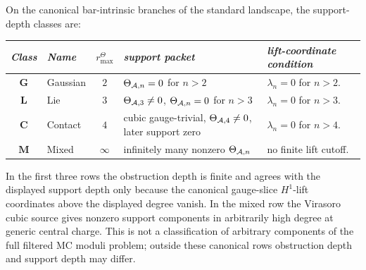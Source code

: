 \begin{theorem}
\label{thm:thqg-four-class}
\ClaimStatusProvedHere
{}
On the canonical bar-intrinsic branches of the standard landscape,
the support-depth classes are:
\begin{center}
\small
\renewcommand{\arraystretch}{1.15}
\begin{tabular}{clcp{}p{}}
\toprule
\emph{Class} & \emph{Name} & \(r^\Theta_{\max}\) &
\emph{support packet} & \emph{lift-coordinate condition} \\
\midrule
$\mathbf{G}$ & Gaussian &
 $2$ &
 \(\Theta_{\mathcal{A},n}=0\) for \(n>2\) &
 \(\lambda_n=0\) for \(n>2\). \\
$\mathbf{L}$ & Lie &
 $3$ &
 \(\Theta_{\mathcal{A},3}\neq0\), \(\Theta_{\mathcal{A},n}=0\) for \(n>3\) &
 \(\lambda_n=0\) for \(n>3\). \\
$\mathbf{C}$ & Contact &
 $4$ &
 cubic gauge-trivial, \(\Theta_{\mathcal{A},4}\neq0\), later support zero &
 \(\lambda_n=0\) for \(n>4\). \\
$\mathbf{M}$ & Mixed &
 $\infty$ &
 infinitely many nonzero \(\Theta_{\mathcal{A},n}\) &
 no finite lift cutoff.\\
\bottomrule
\end{tabular}
\end{center}
In the first three rows the obstruction depth is finite and agrees
with the displayed support depth only because the canonical
gauge-slice \(H^1\)-lift coordinates above the displayed degree
vanish. In the mixed row the Virasoro cubic source gives nonzero
support components in arbitrarily high degree at generic central
charge. This is not a classification of arbitrary components of
the full filtered MC moduli problem; outside these canonical rows
obstruction depth and support depth may differ.
\end{theorem}

